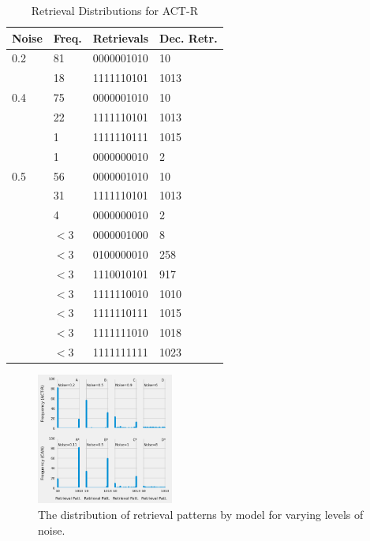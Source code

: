 \documentclass[10pt,letterpaper]{article}
\begin{document}
\begin{table}%
\begin{center} 
\caption{Retrieval Distributions for ACT-R} 
\label{ibl-endstate-table} 
\begin{tabular}{llll} 
\hline
Noise  & Freq.  &  Retrievals & Dec. Retr.\\
\hline
0.2 & 81    & 0000001010 & 10 \\
    & 18  &    1111110101 & 1013 \\
\hline

0.4 &    75    & 0000001010 & 10 \\
        & 22  &    1111110101 & 1013 \\
     & 1 & 1111110111 & 1015 \\
     & 1 & 0000000010 & 2\\
\hline
0.5 &    56    & 0000001010 & 10\\
        & 31  &    1111110101 & 1013\\
             & 4 & 0000000010 & 2 \\
        & $<3$ & 0000001000 & 8 \\
        & $<3$ & 0100000010 & 258\\
        & $<3$ & 1110010101 & 917\\
        & $<3$ & 1111110010 & 1010\\
        & $<3$ & 1111110111 & 1015\\
        & $<3$ & 1111111010 & 1018\\
        & $<3$ & 1111111111 & 1023\\
\hline
\end{tabular} 
\end{center} 
\end{table}
%
\begin{figure}%
\begin{center}
\includegraphics[width=0.4\textwidth,height=0.3\textwidth]{CAN_Gibbs_2X4.png}
\end{center}
\caption{The distribution of retrieval patterns by model for varying levels of noise.} 
\label{NoiseGibbs-figure}
\end{figure}
\end{document}
